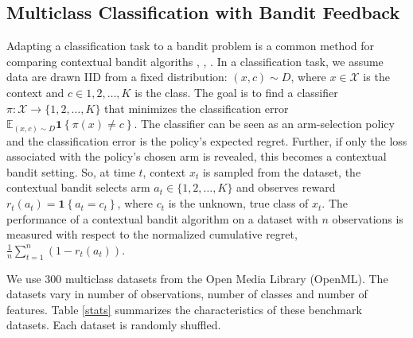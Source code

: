 \documentclass[letterpaper]{article} %
\def\X{\mathcal{X}}
\def\E{\mathbb{E}}
\begin{document}
\subsection{Multiclass Classification with Bandit Feedback}\label{subsec:multi_class}

Adapting a classification task to a bandit problem is a common method for comparing contextual bandit algoriths \cite{dudik-offline-1}, \cite{agarwal-ilovetoconbandits}, \cite{bietti2018contextual}. In a classification task, we assume data are drawn IID from a fixed distribution: $(x, c) \sim D$, where $x \in \X$ is the context and $c \in {1, 2, \dots, K}$ is the class. The goal is to find a classifier $\pi: \X \rightarrow \{1, 2, \dots, K\}$ that minimizes the classification error $\E_{(x, c) \sim D}\mathbf{1}\left\{\pi(x) \neq c\right\}$. The classifier can be seen as an arm-selection policy and the classification error is the policy's expected regret. Further, if only the loss associated with the policy's chosen arm is revealed, this becomes a contextual bandit setting. So, at time $t$, context $x_t$ is sampled from the dataset, the contextual bandit selects arm $a_t \in \{1, 2, \dots, K\}$ and observes reward $r_t(a_t) = \mathbf{1}\left\{a_t = c_t\right\}$, where $c_t$ is the unknown, true class of $x_t$.
The performance of a contextual bandit algorithm on a dataset with $n$ observations is measured with respect to the normalized cumulative regret, $\frac{1}{n} \sum_{t =1}^n{\left(1 - r_t(a_t)\right)}$.

We use 300 multiclass datasets from the Open Media Library (OpenML). The datasets vary in number of observations, number of classes and number of features. Table \ref{stats} summarizes the characteristics of these benchmark datasets. Each dataset is randomly shuffled.
\end{document}
